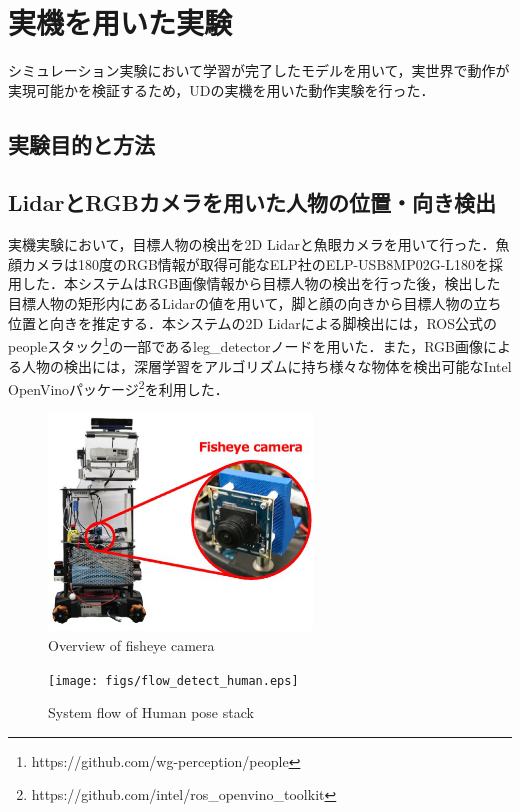 \documentclass[12pt]{sonota/aislab}
\begin{document}
\section{実機を用いた実験}
シミュレーション実験において学習が完了したモデルを用いて，実世界で動作が実現可能かを検証するため，UDの実機を用いた動作実験を行った．

\subsection{実験目的と方法}
\subsection{LidarとRGBカメラを用いた人物の位置・向き検出}
実機実験において，目標人物の検出を2D Lidarと魚眼カメラを用いて行った．魚顔カメラは180度のRGB情報が取得可能なELP社のELP-USB8MP02G-L180を採用した．本システムはRGB画像情報から目標人物の検出を行った後，検出した目標人物の矩形内にあるLidarの値を用いて，脚と顔の向きから目標人物の立ち位置と向きを推定する．本システムの2D Lidarによる脚検出には，ROS公式のpeopleスタック\footnote{https://github.com/wg-perception/people}の一部であるleg\_detectorノードを用いた．また，RGB画像による人物の検出には，深層学習をアルゴリズムに持ち様々な物体を検出可能なIntel OpenVinoパッケージ\footnote{https://github.com/intel/ros\_openvino\_toolkit}を利用した．

\begin{figure}[t]
\begin{center}
\includegraphics[clip, width=7cm]{figs/ud_with_fisheyecamera.eps}
\caption{Overview of fisheye camera}
\label{ud_with_fisheyecamera}
\end{center}
\end{figure}

\begin{figure}[t]
\begin{center}
\texttt{[image: figs/flow\_detect\_human.eps]}
\caption{System flow of Human pose stack}
\label{flow}
\end{center}
\end{figure}
\end{document}
